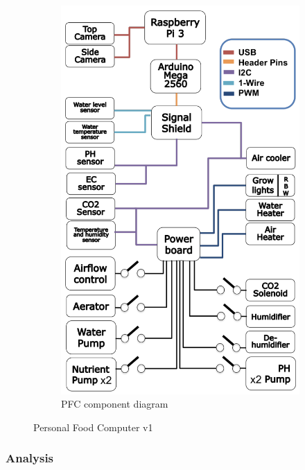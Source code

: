 \begin{figure}[h]
\begin{subfigure}[b]{0.26\textwidth}
        \includegraphics[width=\textwidth]{../assets/pfc-components.png}
        \caption{PFC component diagram}
        \label{fig:pfc-components}
    \end{subfigure}
    \begin{subfigure}[b]{0.10\textwidth}
        \hfill
    \end{subfigure}
    \caption{Personal Food Computer v1 \cite{mit-pfc}}
    \label{fig:pfc}
\end{figure}

\subsubsection{Analysis}


